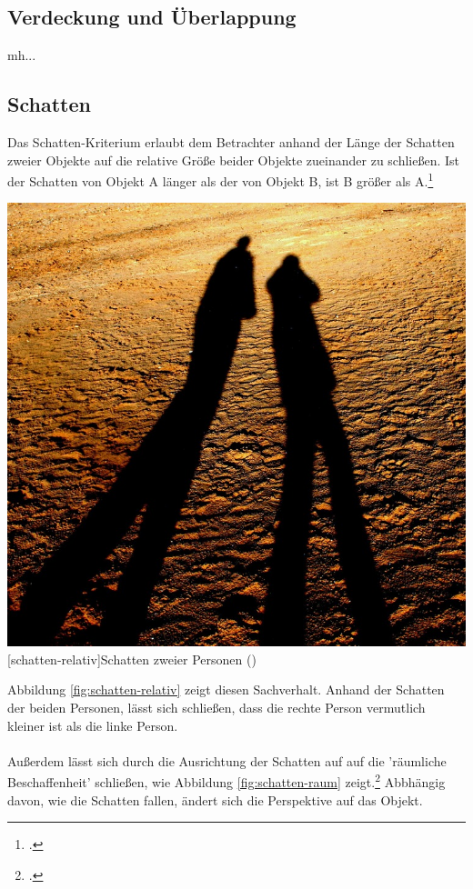 \subsection{Verdeckung und Überlappung}
mh...

\subsection{Schatten}
Das Schatten-Kriterium erlaubt dem Betrachter anhand der Länge der Schatten zweier Objekte auf die relative Größe beider Objekte zueinander zu schließen. Ist der Schatten von Objekt A länger als der von Objekt B, ist B größer als A.\footcite[Vgl.][S.43]{Gras16}\\

\vspace{1em}
\begin{minipage}{\linewidth}
	\centering
	\includegraphics[width=0.7\linewidth]{images/schatten_personen.jpg}
	[schatten-relativ]{Schatten zweier Personen (\cite{PixaXX})}
	\label{fig:schatten-relativ}
\end{minipage}
\vspace{1em} 

Abbildung \ref{fig:schatten-relativ} zeigt diesen Sachverhalt. Anhand der Schatten der beiden Personen, lässt sich schließen, dass die rechte Person vermutlich kleiner ist als die linke Person.\\
\\
Außerdem lässt sich durch die Ausrichtung der Schatten auf auf die 'räumliche Beschaffenheit' schließen, wie Abbildung \ref{fig:schatten-raum} zeigt.\footcite[Vgl.]{heidXX} Abbhängig davon, wie die Schatten fallen, ändert sich die Perspektive auf das Objekt.\\


